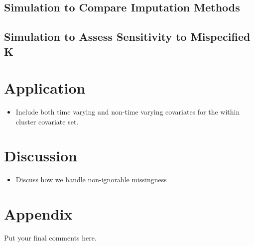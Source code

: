 \documentclass[useAMS,referee]{biom}
\begin{document}
\subsection{Simulation to Compare Imputation Methods}

\subsection{Simulation to Assess Sensitivity to Mispecified K}

\newpage

\section{Application}
\label{s:app}

\begin{itemize}

\item Include both time varying and non-time varying covariates for the within cluster covariate set. 

\end{itemize}

\newpage

\section{Discussion}
\label{s:discuss}

\begin{itemize}

\item Discuss how we handle non-ignorable missingness 

\end{itemize}


\section{Appendix}

Put your final comments here. 


\backmatter

\end{document}
